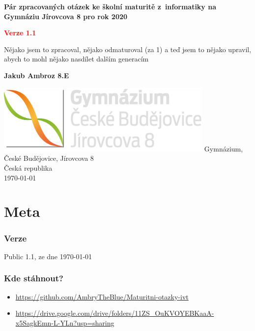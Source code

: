 \documentclass[12pt]{article}
\begin{document}
\begin{titlepage}
   \begin{center}
       \vspace*{1cm}

		\begin{Huge}
		 \textbf{Pár zpracovaných otázek ke školní maturitě z~informatiky na Gymnáziu Jírovcova 8 pro rok 2020}\\
		\end{Huge}
		\vspace{0.5cm}
		\begin{LARGE}
		\textbf{\textcolor{red}{Verze 1.1}}
		\end{LARGE}


       \vspace{0.5cm}
       Nějako jsem to zpracoval, nějako odmaturoval (za 1) a teď jsem to nějako upravil, abych to mohl nějako nasdílet dalším generacím
       
       \vspace{1.5cm}
		\begin{LARGE}
		\textbf{Jakub Ambroz 8.E}
		\end{LARGE}
		
       \vfill
       \vspace{0.8cm}
       \includegraphics[width=0.8\textwidth]{logo-src.png}
       Gymnázium, České Budějovice, Jírovcova 8\\
       Česká republika\\
       \today
   \end{center}
\end{titlepage}

\section*{Meta}
\subsubsection{Verze}
Public 1.1, ze dne \today
\subsubsection{Kde stáhnout?}
\begin{itemize}
\item \url{https://github.com/AmbryTheBlue/Maturitni-otazky-ivt}
\item \url{https://drive.google.com/drive/folders/11ZS_OuKVOYEBKaaA-x5SagkEmn-L-YLn?usp=sharing}
\end{itemize}
\end{document}
